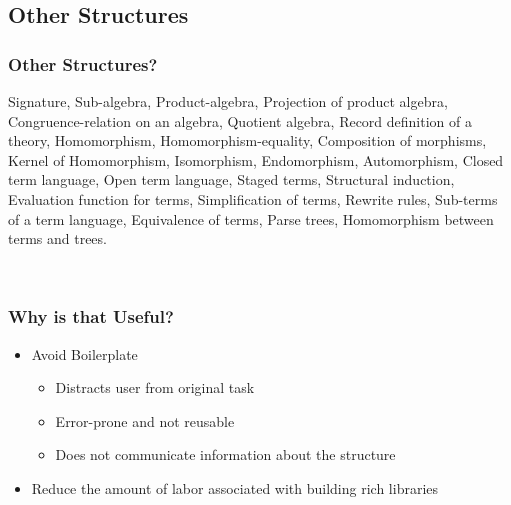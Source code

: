 \documentclass[t,12pt,numbers,fleqn,usenames,xcolor=dvipsnames]{beamer}
\begin{document}

\subsection{Other Structures}
\begin{frame}
\frametitle{Other Structures?}
\vspace{0.15cm}
{\scriptsize
	Signature, Sub-algebra, Product-algebra, Projection of product algebra, Congruence-relation on 
	an algebra, Quotient algebra, Record definition of a theory, Homomorphism, 
	Homomorphism-equality, Composition of morphisms, Kernel of Homomorphism, Isomorphism, 
	Endomorphism, Automorphism, Closed term language, Open term language, Staged terms, 
	Structural induction, Evaluation function for terms, Simplification of terms, Rewrite rules, 
	Sub-terms of a term language, Equivalence of terms, Parse trees, Homomorphism between 
	terms and trees. 
}

\vspace{0.3cm}
\pause
{}
\
\end{frame}

\begin{frame}
\frametitle{Why is that Useful?}
\begin{itemize}
\item Avoid Boilerplate 
\begin{itemize}
	\item Distracts user from original task 
	\item Error-prone and not reusable 
	\item Does not communicate information about the structure 
\end{itemize}
\item Reduce the amount of labor associated with building rich libraries 
\end{itemize}
\end{frame}
\end{document}
